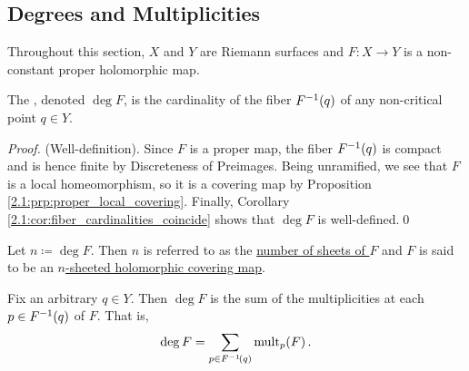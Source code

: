 \documentclass[../Moduli_Spaces_of_Riemann_Surfaces.tex]{subfiles}
\begin{document}
    \subsection{Degrees and Multiplicities}
    Throughout this section, $X$ and $Y$ are Riemann surfaces and $F:X\to Y$ is a non-constant proper holomorphic map.
    \begin{definition}
        The , denoted $\deg F$, is the cardinality of the fiber $F^{-1}\!\left(q\right)$ of any non-critical point $q\in Y$.
    \end{definition}
    \begin{proof}
        (Well-definition). Since $F$ is a proper map, the fiber $F^{-1}\!\left(q\right)$ is compact and is hence finite by Discreteness of Preimages. Being unramified, we see that $F$ is a local homeomorphism, so it is a covering map by Proposition \ref{2.1:prp:proper_local_covering}. Finally, Corollary \ref{2.1:cor:fiber_cardinalities_coincide} shows that $\deg F$ is well-defined.\qed
    \end{proof}
    \begin{remark}
        Let $n\coloneqq\deg F$. Then $n$ is referred to as the \ul{number of sheets of $F$} and $F$ is said to be an \ul{$n$-sheeted holomorphic covering map}.\exqed
    \end{remark}
    \begin{theorem}
        Fix an arbitrary $q\in Y$. Then $\deg F$ is the sum of the multiplicities at each $p\in F^{-1}\!\left(q\right)$ of $F$. That is,
        \begin{equation*}
            \deg F=\sum_{p\in F^{-1}\!\left(q\right)}\operatorname{mult}_p\!\left(F\right).
        \end{equation*}
    \end{theorem}
    \vspace{-0.1in}
\end{document}
